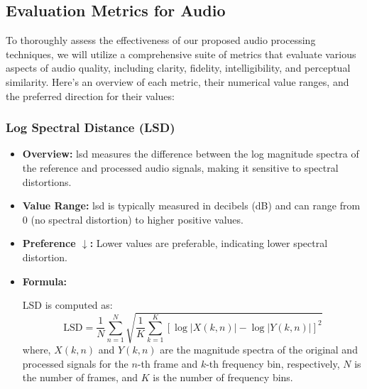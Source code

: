\subsection{Evaluation Metrics for Audio}
To thoroughly assess the effectiveness of our proposed audio processing techniques, we will utilize a comprehensive suite of metrics that evaluate various aspects of audio quality, including clarity, fidelity, intelligibility, and perceptual similarity. Here's an overview of each metric, their numerical value ranges, and the preferred direction for their values:

\subsubsection{Log Spectral Distance (LSD)}
\begin{itemize}
    \item \textbf{Overview:} \gls{lsd} measures the difference between the log magnitude spectra of the reference and processed audio signals, making it sensitive to spectral distortions.
    
    \item \textbf{Value Range:} \gls{lsd} is typically measured in decibels (dB) and can range from 0 (no spectral distortion) to higher positive values.
    
    \item \textbf{Preference $\downarrow$:} Lower values are preferable, indicating lower spectral distortion.
    
    \item \textbf{Formula:}
    
    LSD is computed as:
    \begin{equation}
        \text{LSD} = \frac{1}{N} \sum_{n=1}^{N} \sqrt{\frac{1}{K} \sum_{k=1}^{K} \left[ \log |X(k,n)| - \log |Y(k,n)| \right]^2}
    \end{equation}
    where, \( X(k,n) \) and \( Y(k,n) \) are the magnitude spectra of the original and processed signals for the \( n \)-th frame and \( k \)-th frequency bin, respectively, \( N \) is the number of frames, and \( K \) is the number of frequency bins.
\end{itemize}

